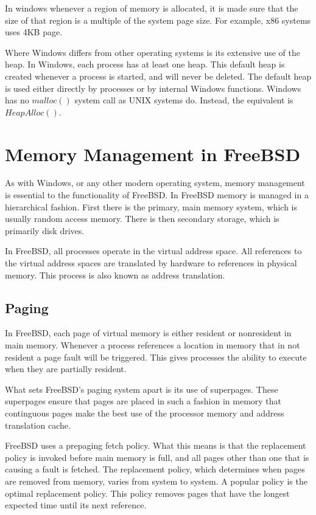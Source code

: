 \documentclass[letterpaper,10pt,titlepage,draftclsnofoot,onecolumn]{IEEEtran}
\begin{document}
In windows whenever a region of memory is allocated, it is made sure that the size of that region is a multiple of the system page size. For example, x86 systems uses 4KB page.

Where Windows differs from other operating systems is its extensive use of the heap. In Windows, each process has at least one heap. This default heap is created whenever a process is started, and will never be deleted. The default heap is used either directly by processes or by internal Windows functions. Windows has no $malloc()$ system call as UNIX systems do. Instead, the equivalent is $HeapAlloc()$. \cite{windows}

\section{Memory Management in FreeBSD}
As with Windows, or any other modern operating system, memory management is essential to the functionality of FreeBSD. In FreeBSD memory is managed in a hierarchical fashion. \cite{freebsd} First there is the primary, main memory system, which is usually random access memory. There is then secondary storage, which is primarily disk drives. 

In FreeBSD, all processes operate in the virtual address space. All references to the virtual address spaces are translated by hardware to references in physical memory. This process is also known as address translation. \cite{freebsd}

\subsection{Paging}
In FreeBSD, each page of virtual memory is either resident or nonresident in main memory. Whenever a process references a location in memory that in not resident a page fault will be triggered. This gives processes the ability to execute when they are partially resident. \cite{freebsd} 

What sets FreeBSD's paging system apart is its use of superpages. These superpages ensure that pages are placed in such a fashion in memory that continguous pages make the best use of the processor memory and address translation cache. 

FreeBSD uses a prepaging fetch policy. What this means is that the replacement policy is invoked before main memory is full, and all pages other than one that is causing a fault is fetched. \cite{freebsd} The replacement policy, which determines when pages are removed from memory, varies from system to system. A popular policy is the optimal replacement policy. This policy removes pages that have the longest expected time until its next reference. 
\end{document}
